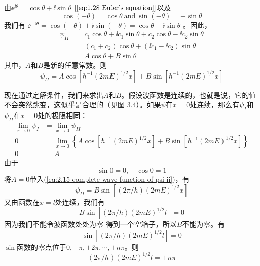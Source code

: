 	由$\ee^{\ii \theta} = \cos\theta+\ii \sin\theta$ $\left[\ref{eq:1.28 Euler's equation}\right]$以及
	\begin{equation}
		\boxed{
			\cos\left(-\theta\right) = \cos\theta \: \text{and} \: \sin\left(-\theta\right) = -\sin\theta
		}
		\label{eq:2.14 properties of sin and cos}
	\end{equation}
	我们有
	$\ee^{-\ii \theta} = \cos \left(-\theta\right)+\ii \sin\left(-\theta\right)=\cos\theta-\ii \sin\theta$
	。因此，
	\begin{equation*}
		\begin{aligned}
			\psi_{II} & =c_1\cos\theta+\ii c_1\sin\theta+c_2\cos\theta-\ii c_2\sin\theta \\
			& = \left(c_1+c_2\right)\cos\theta+\left(\ii c_1-\ii c_2\right)\sin\theta \\
			& = A \cos\theta + B\sin\theta 
		\end{aligned}	
	\end{equation*}
	其中，$A$和$B$是新的任意常数。则
	\begin{equation}
		\psi_{II}= A \cos\left[\hbar^{-1}\left(2mE\right)^{1/2}x\right]+B \sin\left[\hbar^{-1}\left(2mE\right)^{1/2}x\right]
		\label{eq:2.15 complete wave function of psi ii}
	\end{equation}

	现在通过定解条件，我们来求出$A$和$B$。假设波函数是连续的，也就是说，它的值不会突然跳变，这似乎是合理的（见图 3.4）。如果$\psi$在$x=0$处连续，那么有$\psi_I$和$\psi_{II}$在$x=0$处的极限相同：
	\begin{equation*}
		\begin{aligned}
			\lim\limits_{x \to 0}\psi_I & = \lim\limits_{x \to 0}\psi_{II} \\
			0 & = \lim\limits_{x \to 0}\left\{A \cos\left[\hbar^{-1}\left(2mE\right)^{1/2}x\right]+B \sin\left[\hbar^{-1}\left(2mE\right)^{1/2}x\right]\right\} \\
			0 & = A
		\end{aligned}
	\end{equation*}
	由于
	\begin{equation}
		\boxed{
			\sin 0 = 0, \quad \cos 0 =1
		}
		\label{eq:2.16 sin0 and cos0}
	\end{equation}
	将$A=0$带入(\ref{eq:2.15 complete wave function of psi ii})，有
	\begin{equation}
		\psi_{II} = B\sin\left[\left(2\pi/h\right)\left(2mE\right)^{1/2}x\right]
		\label{eq:2.17 }
	\end{equation}
	又由函数在$x=l$处连续，我们有
	\begin{equation}
		B\sin\left[\left(2\pi/h\right)\left(2mE\right)^{1/2}l\right]=0
		\label{eq:2.18}
	\end{equation}
	因为我们不能令波函数处处为零-得到一个空箱子，所以$B$不能为零。有
	\begin{equation*}
		\sin\left[\left(2\pi/h\right)\left(2mE\right)^{1/2}l\right]=0
	\end{equation*}
	$\sin$函数的零点位于$0, \pm \pi, \pm 2\pi, \cdots, \pm n \pi$。则
	\begin{equation}
		\left(2\pi/h\right)\left(2mE\right)^{1/2}l = \pm n \pi
		\label{eq:2.19 introduction of n}
	\end{equation}


